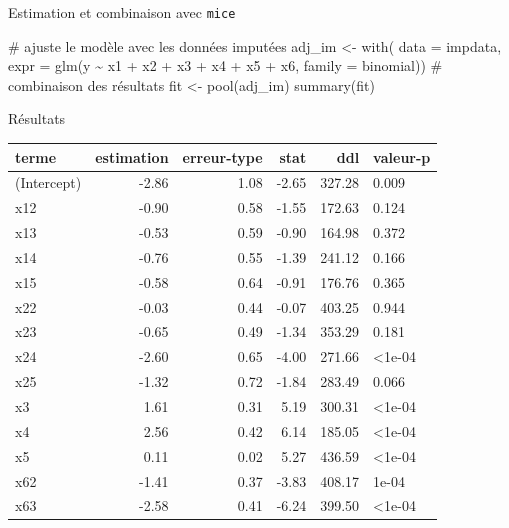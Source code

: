 \documentclass[
  ignorenonframetext,
]{beamer}
\newenvironment{Shaded}{\begin{snugshade}}{\end{snugshade}}
\newcommand{\AttributeTok}[1]{\textcolor[rgb]{0.40,0.45,0.13}{#1}}
\newcommand{\CommentTok}[1]{\textcolor[rgb]{0.37,0.37,0.37}{#1}}
\newcommand{\FunctionTok}[1]{\textcolor[rgb]{0.28,0.35,0.67}{#1}}
\newcommand{\NormalTok}[1]{\textcolor[rgb]{0.00,0.23,0.31}{#1}}
\newcommand{\OtherTok}[1]{\textcolor[rgb]{0.00,0.23,0.31}{#1}}
\newcommand{\SpecialCharTok}[1]{\textcolor[rgb]{0.37,0.37,0.37}{#1}}
\begin{document}
\begin{frame}[fragile]{Estimation et combinaison avec \texttt{mice}}
\protect\hypertarget{estimation-et-combinaison-avec-mice}{}
\begin{Shaded}
\begin{Highlighting}[numbers=left,,]
\CommentTok{\# ajuste le modèle avec les données imputées}
\NormalTok{adj\_im }\OtherTok{\textless{}{-}} \FunctionTok{with}\NormalTok{(}
  \AttributeTok{data =}\NormalTok{ impdata,}
  \AttributeTok{expr =} \FunctionTok{glm}\NormalTok{(y }\SpecialCharTok{\textasciitilde{}}\NormalTok{ x1 }\SpecialCharTok{+}\NormalTok{ x2 }\SpecialCharTok{+}\NormalTok{ x3 }\SpecialCharTok{+}\NormalTok{ x4 }\SpecialCharTok{+}\NormalTok{ x5 }\SpecialCharTok{+}\NormalTok{ x6,}
             \AttributeTok{family =}\NormalTok{ binomial))}
\CommentTok{\# combinaison des résultats }
\NormalTok{fit }\OtherTok{\textless{}{-}} \FunctionTok{pool}\NormalTok{(adj\_im)}
\FunctionTok{summary}\NormalTok{(fit)}
\end{Highlighting}
\end{Shaded}
\end{frame}

\begin{frame}{Résultats}
\protect\hypertarget{ruxe9sultats}{}
\begin{table}
\centering
\begin{tabular}{lrrrrl}
\toprule
terme & estimation & erreur-type & stat & ddl & valeur-p\\
\midrule
(Intercept) & -2.86 & 1.08 & -2.65 & 327.28 & 0.009\\
x12 & -0.90 & 0.58 & -1.55 & 172.63 & 0.124\\
x13 & -0.53 & 0.59 & -0.90 & 164.98 & 0.372\\
x14 & -0.76 & 0.55 & -1.39 & 241.12 & 0.166\\
x15 & -0.58 & 0.64 & -0.91 & 176.76 & 0.365\\
x22 & -0.03 & 0.44 & -0.07 & 403.25 & 0.944\\
x23 & -0.65 & 0.49 & -1.34 & 353.29 & 0.181\\
x24 & -2.60 & 0.65 & -4.00 & 271.66 & <1e-04\\
x25 & -1.32 & 0.72 & -1.84 & 283.49 & 0.066\\
x3 & 1.61 & 0.31 & 5.19 & 300.31 & <1e-04\\
x4 & 2.56 & 0.42 & 6.14 & 185.05 & <1e-04\\
x5 & 0.11 & 0.02 & 5.27 & 436.59 & <1e-04\\
x62 & -1.41 & 0.37 & -3.83 & 408.17 & 1e-04\\
x63 & -2.58 & 0.41 & -6.24 & 399.50 & <1e-04\\
\bottomrule
\end{tabular}
\end{table}
\end{frame}
\end{document}
